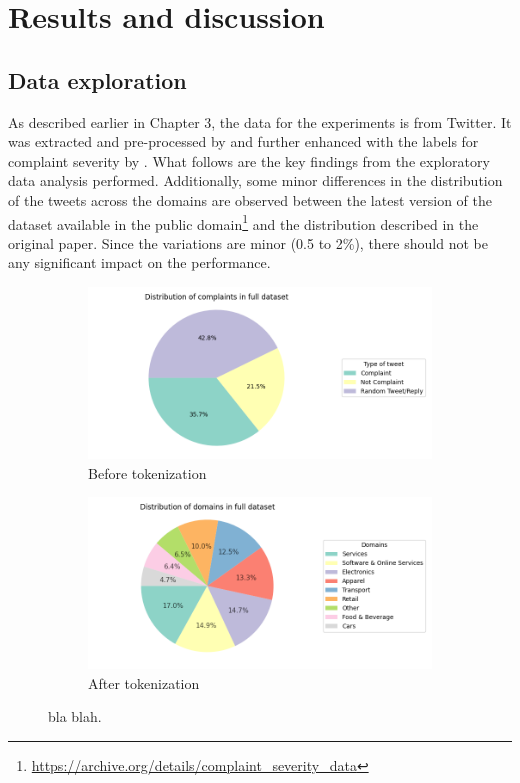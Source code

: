 \chapter{Results and discussion}

\section{Data exploration}
As described earlier in Chapter 3, the data for the experiments is from Twitter. It was extracted and pre-processed by \cite{preotiuc-pietro_automatically_2019} and further enhanced with the labels for complaint severity by \cite{jinModelingSeverityComplaints2021}. What follows are the key findings from the exploratory data analysis performed. Additionally, some minor differences in the distribution of the tweets across the domains are observed between the latest version of the dataset available in the public domain\footnote{\url{https://archive.org/details/complaint_severity_data}} and the distribution described in the original paper. Since the variations are minor (0.5 to 2\%), there should not be any significant impact on the performance.

\begin{figure}[htbp]
    \centering
    \captionsetup{font=small}
    \begin{subfigure}{0.48\textwidth}
        \centering
        \includegraphics[width=\linewidth]{figures/compl_non_random_dist.png}
        \caption{Before tokenization}
        \label{fig: compl_non_random_dist}
    \end{subfigure}
    \hfill
    \begin{subfigure}[b]{0.48\textwidth}
        \centering
        \includegraphics[width=\linewidth]{figures/domain_dist.png}
        \caption{After tokenization}
        \label{fig: domain_dist}
    \end{subfigure}
    \caption{bla blah.}
    \label{fig: compl_main_dist}
\end{figure}


